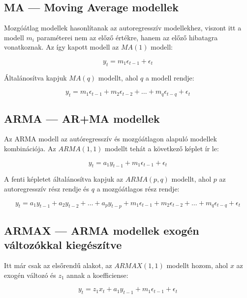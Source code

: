 \subsection{MA --- Moving Average modellek}

Mozgóátlag modellek hasonlítanak az autoregresszív modellekhez, viszont itt a modell $m_i$
paraméterei nem az előző értékre, hanem az előző hibatagra vonatkoznak. Az így kapott modell az
$MA(1)$ modell:

\begin{equation}
    y_t = m_1\epsilon_{t-1} + \epsilon_t
\end{equation}

Általánosítva kapjuk $MA(q)$ modellt, ahol $q$ a modell rendje:

\begin{equation}
    y_t = m_1\epsilon_{t-1} + m_2\epsilon_{t-2} + \ldots + m_q\epsilon_{t-q} + \epsilon_t %
\end{equation}

\subsection{ARMA --- AR+MA modellek}

Az ARMA modell az autóregresszív és mozgóátlagon alapuló modellek kombinációja. Az $ARMA(1,1)$
modellt tehát a következő képlet ír le:

\begin{equation}
    y_t = a_1y_{t-1} + m_1\epsilon_{t-1} + \epsilon_t
\end{equation}

A fenti képletet általánosítva kapjuk az $ARMA(p,q)$ modellt, ahol $p$ az autoregresszív rész
rendje és $q$ a mozgóátlagos rész rendje:

\begin{equation}
    y_t = a_1y_{t-1} + a_2y_{t-2} + \ldots + a_p y_{t-p} + m_1\epsilon_{t-1} + m_2\epsilon_{t-2} + \ldots + m_q\epsilon_{t-q} + \epsilon_t %
\end{equation}

\subsection{ARMAX --- ARMA modellek exogén változókkal kiegészítve}

Itt már csak az elsőrendű alakot, az $ARMAX(1,1)$ modellt hozom, ahol $x$ az exogén változó és
$z_1$ annak a koefficiense:

\begin{equation}
    y_t = z_1x_t + a_1y_{t-1} + m_1\epsilon_{t-1} + \epsilon_t
\end{equation}

